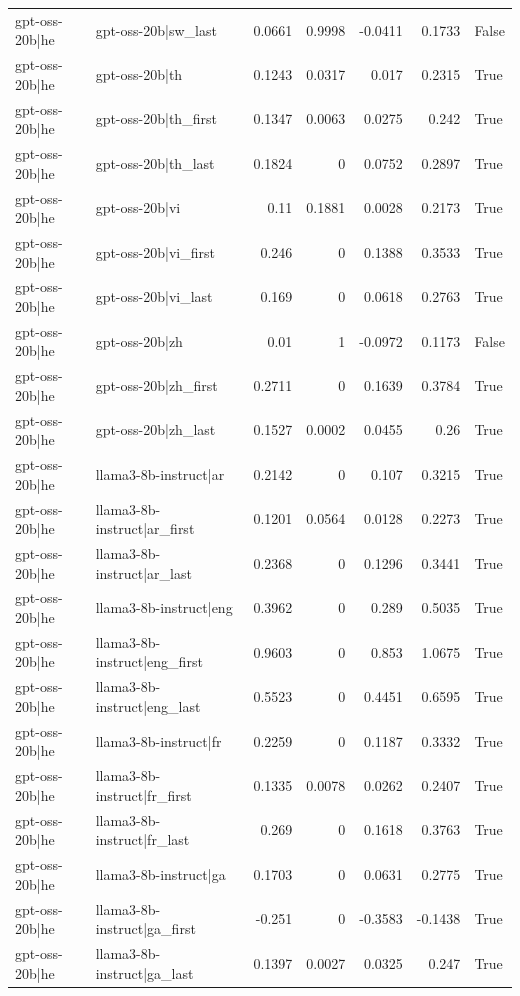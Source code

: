 \begin{table}
\begin{tabular}{l l r r r r l}
gpt-oss-20b|he & gpt-oss-20b|sw_last & 0.0661 & 0.9998 & -0.0411 & 0.1733 & False \\
gpt-oss-20b|he & gpt-oss-20b|th & 0.1243 & 0.0317 & 0.017 & 0.2315 & True \\
gpt-oss-20b|he & gpt-oss-20b|th_first & 0.1347 & 0.0063 & 0.0275 & 0.242 & True \\
gpt-oss-20b|he & gpt-oss-20b|th_last & 0.1824 & 0 & 0.0752 & 0.2897 & True \\
gpt-oss-20b|he & gpt-oss-20b|vi & 0.11 & 0.1881 & 0.0028 & 0.2173 & True \\
gpt-oss-20b|he & gpt-oss-20b|vi_first & 0.246 & 0 & 0.1388 & 0.3533 & True \\
gpt-oss-20b|he & gpt-oss-20b|vi_last & 0.169 & 0 & 0.0618 & 0.2763 & True \\
gpt-oss-20b|he & gpt-oss-20b|zh & 0.01 & 1 & -0.0972 & 0.1173 & False \\
gpt-oss-20b|he & gpt-oss-20b|zh_first & 0.2711 & 0 & 0.1639 & 0.3784 & True \\
gpt-oss-20b|he & gpt-oss-20b|zh_last & 0.1527 & 0.0002 & 0.0455 & 0.26 & True \\
gpt-oss-20b|he & llama3-8b-instruct|ar & 0.2142 & 0 & 0.107 & 0.3215 & True \\
gpt-oss-20b|he & llama3-8b-instruct|ar_first & 0.1201 & 0.0564 & 0.0128 & 0.2273 & True \\
gpt-oss-20b|he & llama3-8b-instruct|ar_last & 0.2368 & 0 & 0.1296 & 0.3441 & True \\
gpt-oss-20b|he & llama3-8b-instruct|eng & 0.3962 & 0 & 0.289 & 0.5035 & True \\
gpt-oss-20b|he & llama3-8b-instruct|eng_first & 0.9603 & 0 & 0.853 & 1.0675 & True \\
gpt-oss-20b|he & llama3-8b-instruct|eng_last & 0.5523 & 0 & 0.4451 & 0.6595 & True \\
gpt-oss-20b|he & llama3-8b-instruct|fr & 0.2259 & 0 & 0.1187 & 0.3332 & True \\
gpt-oss-20b|he & llama3-8b-instruct|fr_first & 0.1335 & 0.0078 & 0.0262 & 0.2407 & True \\
gpt-oss-20b|he & llama3-8b-instruct|fr_last & 0.269 & 0 & 0.1618 & 0.3763 & True \\
gpt-oss-20b|he & llama3-8b-instruct|ga & 0.1703 & 0 & 0.0631 & 0.2775 & True \\
gpt-oss-20b|he & llama3-8b-instruct|ga_first & -0.251 & 0 & -0.3583 & -0.1438 & True \\
gpt-oss-20b|he & llama3-8b-instruct|ga_last & 0.1397 & 0.0027 & 0.0325 & 0.247 & True \\

\end{tabular}
\end{table}

